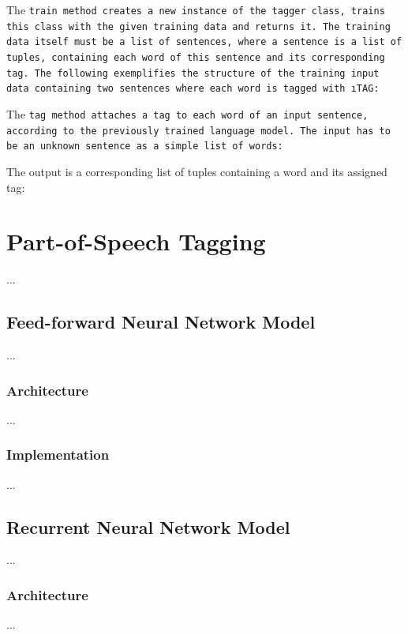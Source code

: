 The \tt{train} method creates a new instance of the tagger class, trains this class with the given training data and returns it. The training data itself must be a list of sentences, where a sentence is a list of tuples, containing each word of this sentence and its corresponding tag. The following exemplifies the structure of the training input data containing two sentences where each word is tagged with \i{TAG}:



The \tt{tag} method attaches a tag to each word of an input sentence, according to the previously trained language model. The input has to be an unknown sentence as a simple list of words:



The output is a corresponding list of tuples containing a word and its assigned tag:




\chapter{Part-of-Speech Tagging}\label{c.postagging}
...

\section{Feed-forward Neural Network Model}\label{c.postagging.fnn}
...

\subsection{Architecture}\label{c.postagging.fnn.architecture}
...

\subsection{Implementation}\label{c.postagging.fnn.implementation}
...

\section{Recurrent Neural Network Model}\label{c.postagging.rnn}
...

\subsection{Architecture}\label{c.postagging.rnn.architecture}
...

